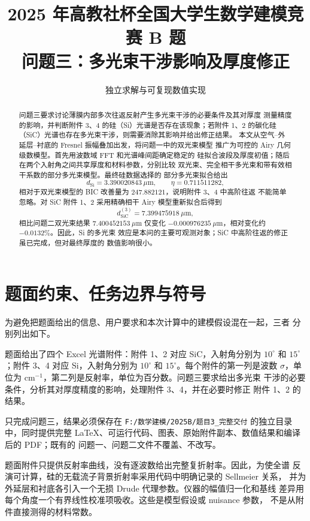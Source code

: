 \documentclass[UTF8,12pt,a4paper]{ctexart}
\title{2025 年高教社杯全国大学生数学建模竞赛 B 题\\[0.4em]
问题三：多光束干涉影响及厚度修正}
\author{独立求解与可复现数值实现}
\date{}
\begin{document}
\maketitle

\begin{abstract}
问题三要求讨论薄膜内部多次往返反射产生多光束干涉的必要条件及其对厚度
测量精度的影响，并判断附件 3、4 的硅（Si）光谱是否存在该现象；若附件
1、2 的碳化硅（SiC）光谱也存在多光束干涉，则需要消除其影响并给出修正结果。
本文从空气--外延层--衬底的 Fresnel 振幅叠加出发，将问题一中的双光束模型
推广为可控的 Airy 几何级数模型。首先用波数域 FFT 和光谱峰间距确定稳定的
硅拟合波段及厚度初值；随后在两个入射角之间共享厚度和材料参数，分别比较
双光束、完全相干多光束和带有效相干系数的部分多光束模型。最终硅数据选择的
部分多光束拟合给出
\[
\boxed{d_{\mathrm{Si}}=3.390020843\ \mu\mathrm{m}},
\qquad \boxed{\eta=0.711511282},
\]
相对于双光束模型的 BIC 改善量为 $247.882121$，说明附件 3、4 中高阶往返
不能简单忽略。对 SiC 附件 1、2 采用精确相干 Airy 模型重新拟合后得到
\[
\boxed{d_{\mathrm{SiC}}^{(3)}=7.399475918\ \mu\mathrm{m}},
\]
相比问题二双光束结果 $7.400452153\ \mu\mathrm{m}$ 仅变化
$-0.000976235\ \mu\mathrm{m}$，相对变化约 $-0.0132\%$。因此，Si 的多光束
效应是本问的主要可观测对象；SiC 中高阶往返的修正虽已完成，但对最终厚度的
数值影响很小。
\end{abstract}

\section{题面约束、任务边界与符号}

为避免把题面给出的信息、用户要求和本次计算中的建模假设混在一起，三者
分别列出如下。

\begin{description}[leftmargin=5em]
  \item[题面事实]
  题面给出了四个 Excel 光谱附件：附件 1、2 对应 SiC，入射角分别为
  $10^\circ$ 和 $15^\circ$；附件 3、4 对应 Si，入射角分别为 $10^\circ$
  和 $15^\circ$。每个附件的第一列是波数 $\sigma$，单位为
  $\mathrm{cm}^{-1}$，第二列是反射率，单位为百分数。问题三要求给出多光束
  干涉的必要条件，分析其对厚度精度的影响，处理附件 3、4，并在必要时修正
  附件 1、2 的结果。
  \item[本次用户任务]
  只完成问题三，结果必须保存在
  \verb|F:/数学建模/2025B/题目3_完整交付| 的独立目录中，同时提供完整
  LaTeX、可运行代码、图表、原始附件副本、数值结果和编译后的 PDF；既有的
  问题一、问题二文件不覆盖、不改写。
  \item[本节额外假设]
  题面附件只提供反射率曲线，没有逐波数给出完整复折射率。因此，为使全谱
  反演可计算，硅的无载流子背景折射率采用代码中明确记录的 Sellmeier 关系，
  并为外延层和衬底各引入一个无损 Drude 代理参数。仪器的幅值归一化和基线
  差异用每个角度一个有界线性校准项吸收。这些是模型假设或 nuisance 参数，
  不是从附件直接测得的材料常数。
\end{description}
\end{document}
